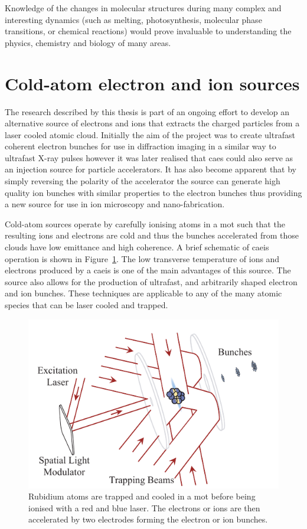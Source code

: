 Knowledge of the changes in molecular structures during many complex and interesting dynamics (such as melting, photosynthesis, molecular phase transitions, or chemical reactions) would prove invaluable to understanding the physics, chemistry and biology of many areas.

\section{Cold-atom electron and ion sources}

The research described by this thesis is part of an ongoing effort to develop an alternative source of electrons and ions that extracts the charged particles from a laser cooled atomic cloud.
Initially the aim of the project was to create ultrafast coherent electron bunches for use in diffraction imaging in a similar way to ultrafast X-ray pulses however it was later realised that \gls{caes} could also serve as an injection source for particle accelerators.
It has also become apparent that by simply reversing the polarity of the accelerator the source can generate high quality ion bunches with similar properties to the electron bunches thus providing a new source for use in ion microscopy and nano-fabrication.

Cold-atom sources operate by carefully ionising atoms in a \gls{mot} such that the resulting ions and electrons are cold and thus the bunches accelerated from those clouds have low emittance and high coherence.
A brief schematic of \gls{caeis} operation is shown in Figure~\ref{figure:simple_caeis_schem}.
The low transverse temperature of ions and electrons produced by a \gls{caeis} is one of the main advantages of this source.
The source also allows for the production of ultrafast, and arbitrarily shaped electron and ion bunches.
These techniques are applicable to any of the many atomic species that can be laser cooled and trapped.

\begin{figure}
    \center
    \includegraphics{0intro/Figs/simple_caeis_schem.pdf}
    \caption[Simplified cold atom ion and electron source schematic.]{Rubidium atoms are trapped and cooled in a \gls{mot} before being ionised with a red and blue laser. The electrons or ions are then accelerated by two electrodes forming the electron or ion bunches.}
    \label{figure:simple_caeis_schem}
\end{figure}

